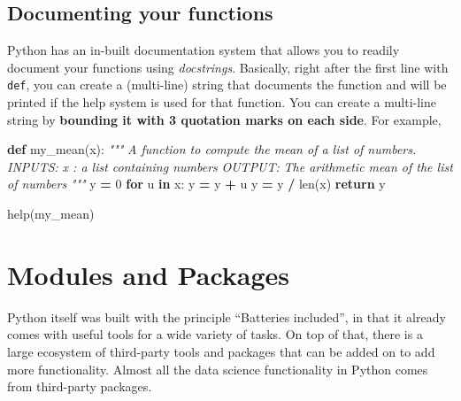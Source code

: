 \documentclass[
  letterpaper,
]{scrbook}
\newenvironment{Shaded}{\begin{snugshade}}{\end{snugshade}}
\newcommand{\BuiltInTok}[1]{#1}
\newcommand{\CommentTok}[1]{\textcolor[rgb]{0.56,0.35,0.01}{\textit{#1}}}
\newcommand{\ControlFlowTok}[1]{\textcolor[rgb]{0.13,0.29,0.53}{\textbf{#1}}}
\newcommand{\DecValTok}[1]{\textcolor[rgb]{0.00,0.00,0.81}{#1}}
\newcommand{\KeywordTok}[1]{\textcolor[rgb]{0.13,0.29,0.53}{\textbf{#1}}}
\newcommand{\NormalTok}[1]{#1}
\newcommand{\OperatorTok}[1]{\textcolor[rgb]{0.81,0.36,0.00}{\textbf{#1}}}
\begin{document}
\hypertarget{documenting-your-functions}{%
\subsection{Documenting your functions}\label{documenting-your-functions}}

Python has an in-built documentation system that allows you to readily document your functions using \emph{docstrings}. Basically, right after the first line with \texttt{def}, you can create a (multi-line) string that documents the function and will be printed if the help system is used for that function. You can create a multi-line string by \textbf{bounding it with 3 quotation marks on each side}. For example,

\begin{Shaded}
\begin{Highlighting}[]
\KeywordTok{def}\NormalTok{ my\_mean(x):}
    \CommentTok{"""}
\CommentTok{  A function to compute the mean of a list of numbers.}
\CommentTok{  }
\CommentTok{  INPUTS:}
\CommentTok{  x : a list containing numbers}
\CommentTok{  }
\CommentTok{  OUTPUT:}
\CommentTok{  The arithmetic mean of the list of numbers}
\CommentTok{  """}
\NormalTok{    y }\OperatorTok{=} \DecValTok{0}
    \ControlFlowTok{for}\NormalTok{ u }\KeywordTok{in}\NormalTok{ x:}
\NormalTok{        y }\OperatorTok{=}\NormalTok{ y }\OperatorTok{+}\NormalTok{ u}
\NormalTok{    y }\OperatorTok{=}\NormalTok{ y }\OperatorTok{/} \BuiltInTok{len}\NormalTok{(x)}
    \ControlFlowTok{return}\NormalTok{ y}
\end{Highlighting}
\end{Shaded}

\begin{Shaded}
\begin{Highlighting}[]
\BuiltInTok{help}\NormalTok{(my\_mean)}
\end{Highlighting}
\end{Shaded}

\hypertarget{modules-and-packages}{%
\section{Modules and Packages}\label{modules-and-packages}}

Python itself was built with the principle ``Batteries included'', in that it already comes with useful tools for a wide variety of tasks. On top of that, there is a large ecosystem of third-party tools and packages that can be added on to add more functionality. Almost all the data science functionality in Python comes from third-party packages.
\end{document}

